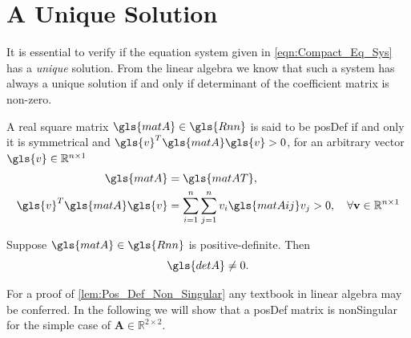 \section{A Unique Solution}
It is essential to verify if the equation system given in \cref{eqn:Compact_Eq_Sys} has a
\emph{unique} solution. From the linear algebra we know that such a system has always a
unique solution if and only if determinant of the coefficient matrix is non-zero.

\begin{definition} \label{def:Positive_Definite}
	A real square matrix $\gls{matA} \in \gls{Rnn}$ is said to be \gls{posDef} if and only it is symmetrical and
	$\gls{v}^{T} \gls{matA} \gls{v} > 0$, for an arbitrary vector $\gls{v} \in \mathbb{R}^{n \times 1}$
	\begin{subequations}
		\begin{align}
			\gls{matA} &= \gls{matAT}, \label{eqn:Pos_Def_Prop_1} \\
			\gls{v}^{T} \gls{matA} \gls{v} &= \sum \limits_{i = 1}^{n} \sum \limits_{j = 1}^{n} v_{i}  \gls{matAij} v_{j} > 0,
				\quad \forall \mathbf{v} \in \mathbb{R}^{n \times 1} \label{eqn:Pos_Def_Prop_2}
		\end{align}
	\end{subequations}
\end{definition}
\begin{lemma} \label{lem:Pos_Def_Non_Singular}
	Suppose $\gls{matA} \in \gls{Rnn}$ is positive-definite. Then
	\begin{equation}
		\gls{detA} \neq 0.
	\end{equation}
\end{lemma}
For a proof of \cref{lem:Pos_Def_Non_Singular} any textbook in linear algebra may be conferred. In the following we will show
that a \gls{posDef} matrix is \gls{nonSingular} for the simple case of $\mathbf{A} \in \mathbb{R}^{2 \times 2}$. \\
